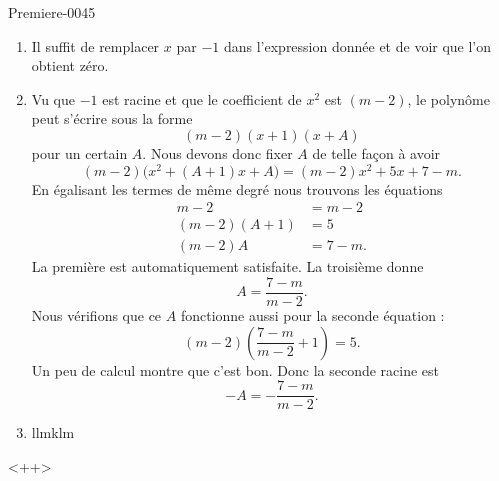 
\begin{corrige}{Premiere-0045}

    \begin{enumerate}
        \item
            Il suffit de remplacer \( x\) par \( -1\) dans l'expression donnée et de voir que l'on obtient zéro.
        \item
            Vu que \( -1\) est racine et que le coefficient de \( x^2\) est \( (m-2)\), le polynôme peut s'écrire sous la forme
            \begin{equation}
                (m-2)(x+1)(x+A)
            \end{equation}
            pour un certain \( A\). Nous devons donc fixer \( A\) de telle façon à avoir
            \begin{equation}
                (m-2)\big( x^2+(A+1)x+A \big)=(m-2)x^2+5x+7-m.
            \end{equation}
            En égalisant les termes de même degré nous trouvons les équations
            \begin{subequations}
                \begin{align}
                    m-2&=m-2\\
                    (m-2)(A+1)&=5\\
                    (m-2)A&=7-m.
                \end{align}
            \end{subequations}
            La première est automatiquement satisfaite. La troisième donne
            \begin{equation}
                A=\frac{ 7-m }{ m-2 }.
            \end{equation}
            Nous vérifions que ce \( A\) fonctionne aussi pour la seconde équation :
            \begin{equation}
                (m-2)\left( \frac{ 7-m }{ m-2 }+1 \right)=5.
            \end{equation}
            Un peu de calcul montre que c'est bon. Donc la seconde racine est
            \begin{equation}
                -A=-\frac{ 7-m }{ m-2 }.
            \end{equation}
        \item
            llmklm
    \end{enumerate}
    <++>

\end{corrige}
